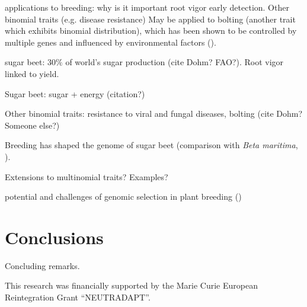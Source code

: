 applications to breeding:
why is it important root vigor early detection. Other binomial traits (e.g.
disease resistance) May be applied to bolting (another trait which
exhibits binomial distribution), which has been shown to be controlled
by multiple genes and influenced by environmental factors
(\cite{salah2012genetic}).

sugar beet: $30\%$ of world's sugar production (cite Dohm? FAO?). Root
vigor linked to yield.

Sugar beet: sugar + energy (citation?)

Other binomial traits: resistance to viral and fungal diseases, bolting
(cite Dohm? Someone else?)

Breeding has shaped the genome of sugar beet (comparison with \emph{Beta
  maritima}, \cite{dohm2013genome}).

Extensions to multinomial traits? Examples?

potential and challenges of genomic selection in plant breeding (\cite{jonas2013does})

%

\section{Conclusions}
\label{sec:conclusions}

Concluding remarks. 


\begin{acknowledgements}
This research was financially supported by the Marie Curie European
Reintegration Grant ``NEUTRADAPT''.
\end{acknowledgements}


